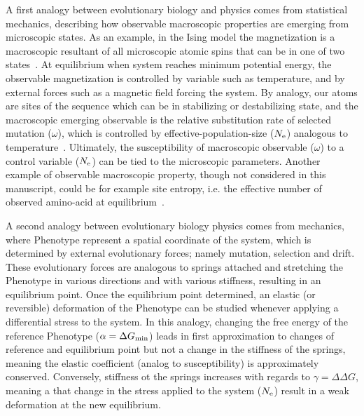 A first analogy between evolutionary biology and physics comes from statistical mechanics, describing how observable macroscopic properties are emerging from microscopic states.
As an example, in the Ising model the magnetization is a macroscopic resultant of all microscopic atomic spins that can be in one of two states~\citep{Brush1967}.
At equilibrium when system reaches minimum potential energy, the observable magnetization is controlled by variable such as temperature, and by external forces such as a magnetic field forcing the system.
By analogy, our atoms are sites of the sequence which can be in stabilizing or destabilizing state, and the macroscopic emerging observable is the relative \gls{substitution} rate of selected mutation ($\omega$), which is controlled by \gls{effective-population-size} ($N_{\mathrm{e}}$) analogous to temperature~\citep{Sella2005}.
Ultimately, the susceptibility of macroscopic observable ($\omega$) to a control variable ($N_{\mathrm{e}}$) can be tied to the microscopic parameters.
Another example of observable macroscopic property, though not considered in this manuscript, could be for example site entropy, i.e. the effective number of observed amino-acid at equilibrium~\citep{Goldstein2016, Jimenez2018, Jiang2018}.

A second analogy between evolutionary biology physics comes from mechanics, where \gls{Phenotype} represent a spatial coordinate of the system, which is determined by external evolutionary forces; namely mutation, selection and drift.
These evolutionary forces are analogous to springs attached and stretching the \gls{Phenotype} in various directions and with various stiffness, resulting in an equilibrium point.
Once the equilibrium point determined, an elastic (or reversible) deformation of the \gls{Phenotype} can be studied whenever applying a differential stress to the system.
In this analogy, changing the free energy of the reference \gls{Phenotype} ($\alpha = \Delta G_{\text{min}}$) leads in first approximation to changes of reference and equilibrium point but not a change in the stiffness of the springs, meaning the elastic coefficient (analog to susceptibility) is approximately conserved.
Conversely, stiffness ot the springs increases with regards to $\gamma = \Delta \Delta G$, meaning a that change in the stress applied to the system ($N_{\mathrm{e}}$) result in a weak deformation at the new equilibrium.

